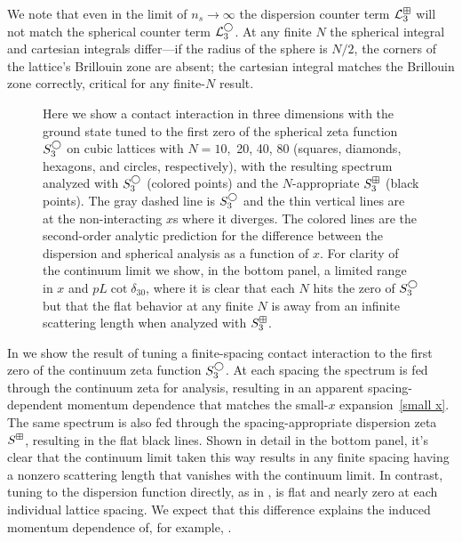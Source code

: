 We note that even in the limit of $n_s \to \infty$ the dispersion counter term $\mathcal{L}^\boxplus_3$ will not match the spherical counter term $\mathcal{L}^{\bigcirc}_3$.
At any finite $N$ the spherical integral and cartesian integrals differ---if the radius of the sphere is $N/2$, the corners of the lattice's Brillouin zone are absent; the cartesian integral matches the Brillouin zone correctly, critical for any finite-$N$ result.

\begin{figure}[htb]
    \scalebox{0.8}{}
    \caption{
        Here we show a contact interaction in three dimensions with the ground state tuned to the first zero of the spherical zeta function $S^{\bigcirc}_3$ on cubic lattices with $N=10,$ 20, 40, 80 (squares, diamonds, hexagons, and circles, respectively), with the resulting spectrum analyzed with $S^{\bigcirc}_3$ (colored points) and the $N$-appropriate $S^{\boxplus}_3$ (black points).
        The gray dashed line is $S^\bigcirc_3$ and the thin vertical lines are at the non-interacting $x$s where it diverges.
        The colored lines are the second-order analytic prediction for the difference between the dispersion and spherical analysis as a function of $x$.
        For clarity of the continuum limit we show, in the bottom panel, a limited range in $x$ and $pL\cot\delta_{30}$, where it is clear that each $N$ hits the zero of $S^\bigcirc_3$ but that the flat behavior at any finite $N$ is away from an infinite scattering length when analyzed with $S^\boxplus_3$.
    }
    \label{fig:3d-corrections}
\end{figure}



In  we show the result of tuning a finite-spacing contact interaction to the first zero of the continuum zeta function $S^\bigcirc_3$.
At each spacing the spectrum is fed through the continuum zeta for analysis, resulting in an apparent spacing-dependent momentum dependence that matches the small-$x$ expansion~\eqref{small x}.
The same spectrum is also fed through the spacing-appropriate dispersion zeta $S^\boxplus$, resulting in the flat black lines.
Shown in detail in the bottom panel, it's clear that the continuum limit taken this way results in any finite spacing having a nonzero scattering length that vanishes with the continuum limit.
In contrast, tuning to the dispersion function directly, as in , is flat and nearly zero at each individual lattice spacing.
We expect that this difference explains the induced momentum dependence of, for example, .


